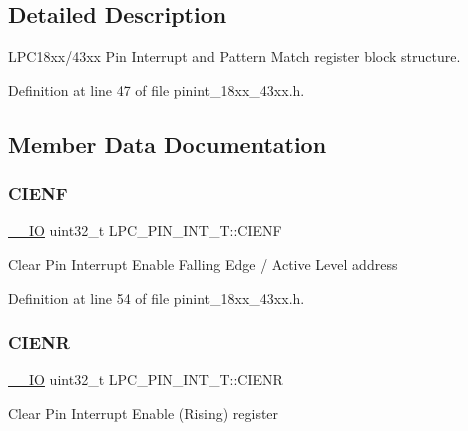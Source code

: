 \subsection{Detailed Description}
L\+P\+C18xx/43xx Pin Interrupt and Pattern Match register block structure. 

Definition at line 47 of file pinint\+\_\+18xx\+\_\+43xx.\+h.



\subsection{Member Data Documentation}
\mbox{\label{struct_l_p_c___p_i_n___i_n_t___t_a6b67da80694013d6e67b935e43027d3f}} 
\subsubsection{\texorpdfstring{C\+I\+E\+NF}{CIENF}}
{\footnotesize\ttfamily \hyperlink{core__sc300_8h_aec43007d9998a0a0e01faede4133d6be}{\+\_\+\+\_\+\+IO} uint32\+\_\+t L\+P\+C\+\_\+\+P\+I\+N\+\_\+\+I\+N\+T\+\_\+\+T\+::\+C\+I\+E\+NF}

Clear Pin Interrupt Enable Falling Edge / Active Level address 

Definition at line 54 of file pinint\+\_\+18xx\+\_\+43xx.\+h.

\mbox{\label{struct_l_p_c___p_i_n___i_n_t___t_ac54c5a5a0ca24c4db057500cba9fd8df}} 
\subsubsection{\texorpdfstring{C\+I\+E\+NR}{CIENR}}
{\footnotesize\ttfamily \hyperlink{core__sc300_8h_aec43007d9998a0a0e01faede4133d6be}{\+\_\+\+\_\+\+IO} uint32\+\_\+t L\+P\+C\+\_\+\+P\+I\+N\+\_\+\+I\+N\+T\+\_\+\+T\+::\+C\+I\+E\+NR}

Clear Pin Interrupt Enable (Rising) register 

